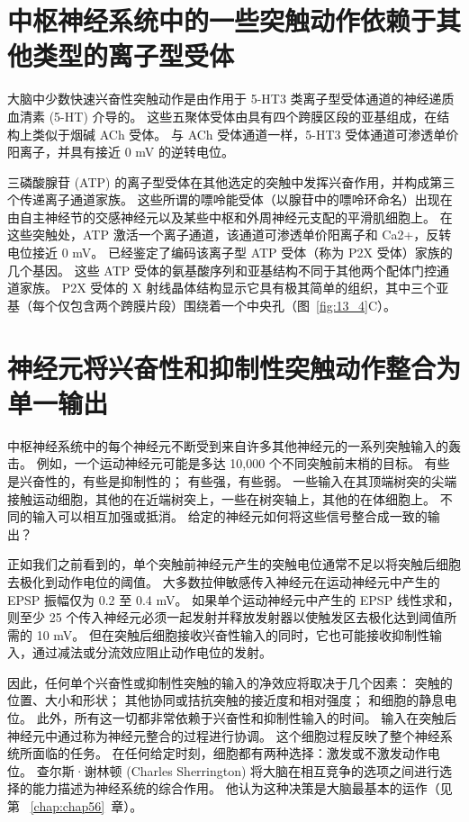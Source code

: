 \section{中枢神经系统中的一些突触动作依赖于其他类型的离子型受体}

大脑中少数快速兴奋性突触动作是由作用于 5-HT3 类离子型受体通道的神经递质血清素 (5-HT) 介导的。
这些五聚体受体由具有四个跨膜区段的亚基组成，在结构上类似于烟碱 ACh 受体。
与 ACh 受体通道一样，5-HT3 受体通道可渗透单价阳离子，并具有接近 0 mV 的逆转电位。


三磷酸腺苷 (ATP) 的离子型受体在其他选定的突触中发挥兴奋作用，并构成第三个传递离子通道家族。
这些所谓的嘌呤能受体（以腺苷中的嘌呤环命名）出现在由自主神经节的交感神经元以及某些中枢和外周神经元支配的平滑肌细胞上。
在这些突触处，ATP 激活一个离子通道，该通道可渗透单价阳离子和 Ca2+，反转电位接近 0 mV。
已经鉴定了编码该离子型 ATP 受体（称为 P2X 受体）家族的几个基因。
这些 ATP 受体的氨基酸序列和亚基结构不同于其他两个配体门控通道家族。
P2X 受体的 X 射线晶体结构显示它具有极其简单的组织，其中三个亚基（每个仅包含两个跨膜片段）围绕着一个中央孔（图~\ref{fig:13_4}C）。



\section{神经元将兴奋性和抑制性突触动作整合为单一输出}

中枢神经系统中的每个神经元不断受到来自许多其他神经元的一系列突触输入的轰击。
例如，一个运动神经元可能是多达 10,000 个不同突触前末梢的目标。
有些是兴奋性的，有些是抑制性的；
有些强，有些弱。
一些输入在其顶端树突的尖端接触运动细胞，其他的在近端树突上，一些在树突轴上，其他的在体细胞上。
不同的输入可以相互加强或抵消。
给定的神经元如何将这些信号整合成一致的输出？


正如我们之前看到的，单个突触前神经元产生的突触电位通常不足以将突触后细胞去极化到动作电位的阈值。
大多数拉伸敏感传入神经元在运动神经元中产生的 EPSP 振幅仅为 0.2 至 0.4 mV。
如果单个运动神经元中产生的 EPSP 线性求和，则至少 25 个传入神经元必须一起发射并释放发射器以使触发区去极化达到阈值所需的 10 mV。
但在突触后细胞接收兴奋性输入的同时，它也可能接收抑制性输入，通过减法或分流效应阻止动作电位的发射。


因此，任何单个兴奋性或抑制性突触的输入的净效应将取决于几个因素：
突触的位置、大小和形状；
其他协同或拮抗突触的接近度和相对强度；
和细胞的静息电位。 
此外，所有这一切都非常依赖于兴奋性和抑制性输入的时间。
输入在突触后神经元中通过称为神经元整合的过程进行协调。
这个细胞过程反映了整个神经系统所面临的任务。
在任何给定时刻，细胞都有两种选择：激发或不激发动作电位。
查尔斯·谢林顿 (Charles Sherrington) 将大脑在相互竞争的选项之间进行选择的能力描述为神经系统的综合作用。
他认为这种决策是大脑最基本的运作（见第 ~\ref{chap:chap56}~章）。



